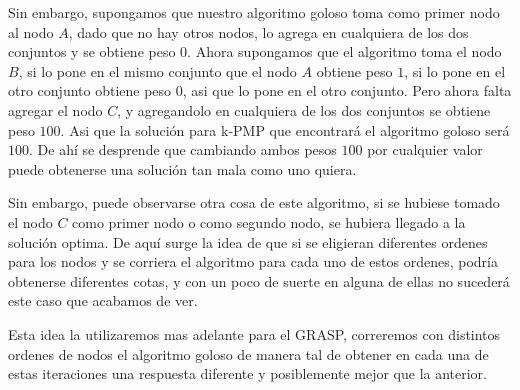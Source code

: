 Sin embargo, supongamos que nuestro algoritmo goloso toma como primer nodo al nodo $A$, dado que no hay otros nodos, lo agrega en cualquiera de los dos conjuntos y se obtiene peso $0$. Ahora supongamos que el algoritmo toma el nodo $B$, si lo pone en el mismo conjunto que el nodo $A$ obtiene peso $1$, si lo pone en el otro conjunto obtiene peso $0$, asi que lo pone en el otro conjunto. Pero ahora falta agregar el nodo $C$, y agregandolo en cualquiera de los dos conjuntos se obtiene peso $100$. Asi que la solución para k-PMP que encontrará el algoritmo goloso será $100$.
De ahí se desprende que cambiando ambos pesos $100$ por cualquier valor puede obtenerse una solución tan mala como uno quiera.

Sin embargo, puede observarse otra cosa de este algoritmo, si se hubiese tomado el nodo $C$ como primer nodo o como segundo nodo, se hubiera llegado a la solución optima. De aquí surge la idea de que si se eligieran diferentes ordenes para los nodos y se corriera el algoritmo para cada uno de estos ordenes, podría obtenerse diferentes cotas, y con un poco de suerte en alguna de ellas no sucederá este caso que acabamos de ver.

Esta idea la utilizaremos mas adelante para el GRASP, correremos con distintos ordenes de nodos el algoritmo goloso de manera tal de obtener en cada una de estas iteraciones una respuesta diferente y posiblemente mejor que la anterior.